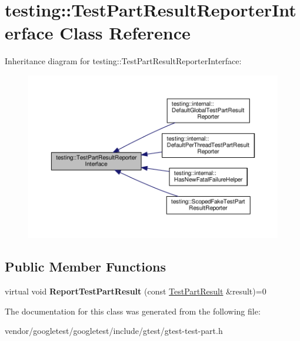 \hypertarget{classtesting_1_1TestPartResultReporterInterface}{}\section{testing\+:\+:Test\+Part\+Result\+Reporter\+Interface Class Reference}
\label{classtesting_1_1TestPartResultReporterInterface}


Inheritance diagram for testing\+:\+:Test\+Part\+Result\+Reporter\+Interface\+:\nopagebreak
\begin{figure}[H]
\begin{center}
\leavevmode
\includegraphics[width=350pt]{classtesting_1_1TestPartResultReporterInterface__inherit__graph}
\end{center}
\end{figure}
\subsection*{Public Member Functions}
\begin{DoxyCompactItemize}
\item 
virtual void {\bfseries Report\+Test\+Part\+Result} (const \hyperlink{classtesting_1_1TestPartResult}{Test\+Part\+Result} \&result)=0\hypertarget{classtesting_1_1TestPartResultReporterInterface_aa2f920e7a5a0a6d0faf19e3727928c22}{}\label{classtesting_1_1TestPartResultReporterInterface_aa2f920e7a5a0a6d0faf19e3727928c22}

\end{DoxyCompactItemize}


The documentation for this class was generated from the following file\+:\begin{DoxyCompactItemize}
\item 
vendor/googletest/googletest/include/gtest/gtest-\/test-\/part.\+h\end{DoxyCompactItemize}
